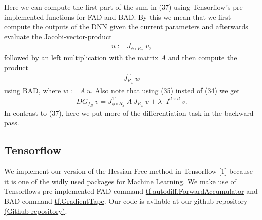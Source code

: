 \documentclass[conference]{IEEEtran}
\begin{document}
	Here we can compute the first part of the sum in (37) using Tensorflow's pre-implemented functions for FAD and BAD. By this we mean that we first compute the outputs of the DNN given the current parameters and afterwards evaluate the Jacobi-vector-product 
	\begin{align}
	u := J_{\phi\circ R _{x}}\:v,
	\end{align}
	followed by an left multiplication with the matrix $A$ and then compute the product 
	\begin{align}
	J_{R_{x}}^{\mathrm{T}}\:w
	\end{align}
	using BAD, where $w := A\:u$. Also note that using (35) insted of (34) we get 
	\begin{align}
	DG_{f_{B}}\:v  = J_{\phi\circ R _{x}}^{\mathrm{T}}\:A\:J_{R _{x}}\:v + \lambda\cdot I^{d\times d}\:v.
	\end{align}
	In contrast to (37), here we put more of the differentiation task in the backward pass. 

	
	\subsection{Tensorflow}
	We implement our version of the Hessian-Free method in Tensorflow [1] because it is one of the widly used packages for Machine Learning.
	We make use of Tensorflows pre-implemented FAD-command \href{https://www.tensorflow.org/api_docs/python/tf/autodiff/ForwardAccumulator}{tf.autodiff.ForwardAccumulator} and BAD-command \href{https://www.tensorflow.org/api_docs/python/tf/GradientTape}{tf.GradientTape}. Our code is avilable at our github repository \href{https://github.com/NiklasBrunn/Hessian_Free_Optimization_of_Deep_Neural_Networks}{(Github repository)}.
	
\end{document}
